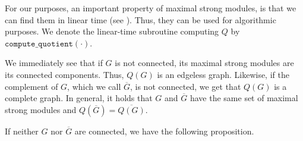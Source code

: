 \documentclass{article}
\begin{document}
    For our purposes, an important
    property of maximal strong modules,
    is that we can find them in linear
    time (see \cite{linear_modules}).
    Thus, they can be used for algorithmic
    purposes.
    We denote the linear-time
    subroutine computing
    $Q$ by $\texttt{compute\_quotient}\left(\cdot\right)$.

    We immediately see that
    if $G$ is not connected, its 
    maximal strong modules are
    its connected components. 
    Thus, $Q\left(G\right)$ is
    an edgeless graph.
    Likewise,
    if the complement of $G$,
    which we call $\overline{G}$, is
    not connected, we get
    that $Q\left(G\right)$ is 
    a complete graph. In general, 
    it holds that
    $G$ and $\overline{G}$ 
    have the same set of maximal
    strong modules
    and $Q\left(\overline{G}\right) = \overline{Q\left(G\right)}$. 

    If neither $G$
    nor $\overline{G}$ are
    connected, we have the following
    proposition.
\end{document}
